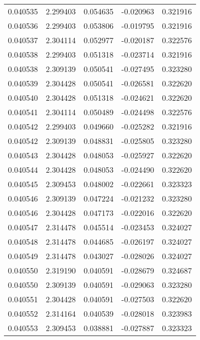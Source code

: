 \begin{tabular}{lrrrr}
0.040535    &  2.299403 &  0.054635 & -0.020963 &             0.321916 \\
0.040536    &  2.299403 &  0.053806 & -0.019795 &             0.321916 \\
0.040537    &  2.304114 &  0.052977 & -0.020187 &             0.322576 \\
0.040538    &  2.299403 &  0.051318 & -0.023714 &             0.321916 \\
0.040538    &  2.309139 &  0.050541 & -0.027495 &             0.323280 \\
0.040539    &  2.304428 &  0.050541 & -0.026581 &             0.322620 \\
0.040540    &  2.304428 &  0.051318 & -0.024621 &             0.322620 \\
0.040541    &  2.304114 &  0.050489 & -0.024498 &             0.322576 \\
0.040542    &  2.299403 &  0.049660 & -0.025282 &             0.321916 \\
0.040542    &  2.309139 &  0.048831 & -0.025805 &             0.323280 \\
0.040543    &  2.304428 &  0.048053 & -0.025927 &             0.322620 \\
0.040544    &  2.304428 &  0.048053 & -0.024490 &             0.322620 \\
0.040545    &  2.309453 &  0.048002 & -0.022661 &             0.323323 \\
0.040546    &  2.309139 &  0.047224 & -0.021232 &             0.323280 \\
0.040546    &  2.304428 &  0.047173 & -0.022016 &             0.322620 \\
0.040547    &  2.314478 &  0.045514 & -0.023453 &             0.324027 \\
0.040548    &  2.314478 &  0.044685 & -0.026197 &             0.324027 \\
0.040549    &  2.314478 &  0.043027 & -0.028026 &             0.324027 \\
0.040550    &  2.319190 &  0.040591 & -0.028679 &             0.324687 \\
0.040550    &  2.309139 &  0.040591 & -0.029063 &             0.323280 \\
0.040551    &  2.304428 &  0.040591 & -0.027503 &             0.322620 \\
0.040552    &  2.314164 &  0.040539 & -0.028018 &             0.323983 \\
0.040553    &  2.309453 &  0.038881 & -0.027887 &             0.323323 \\

\end{tabular}
